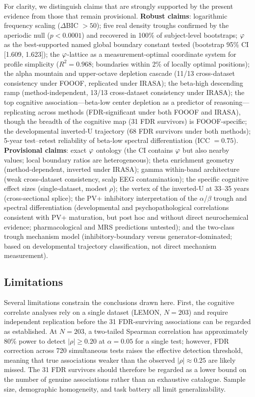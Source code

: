 For clarity, we distinguish claims that are strongly supported by the present evidence from those that remain provisional. \textbf{Robust claims}: logarithmic frequency scaling ($\Delta$BIC $> 50$); five real density troughs confirmed by the aperiodic null ($p < 0.0001$) and recovered in 100\% of subject-level bootstraps; $\varphi$ as the best-supported named global boundary constant tested (bootstrap 95\% CI [1.609, 1.623]); the $\varphi$-lattice as a measurement-optimal coordinate system for profile simplicity ($R^2 = 0.968$; boundaries within 2\% of locally optimal positions); the alpha mountain and upper-octave depletion cascade (11/13 cross-dataset consistency under FOOOF, replicated under IRASA); the beta-high descending ramp (method-independent, 13/13 cross-dataset consistency under IRASA); the top cognitive association---beta-low center depletion as a predictor of reasoning---replicating across methods (FDR-significant under both FOOOF and IRASA), though the breadth of the cognitive map (31 FDR survivors) is FOOOF-specific; the developmental inverted-U trajectory (68 FDR survivors under both methods); 5-year test--retest reliability of beta-low spectral differentiation (ICC $= 0.75$). \textbf{Provisional claims}: exact $\varphi$ ontology (the CI contains $\varphi$ but also nearby values; local boundary ratios are heterogeneous); theta enrichment geometry (method-dependent, inverted under IRASA); gamma within-band architecture (weak cross-dataset consistency, scalp EEG contamination); the specific cognitive effect sizes (single-dataset, modest $\rho$); the vertex of the inverted-U at 33--35 years (cross-sectional splice); the PV+ inhibitory interpretation of the $\alpha$/$\beta$ trough and spectral differentiation (developmental and psychopathological correlations consistent with PV+ maturation, but post hoc and without direct neurochemical evidence; pharmacological and MRS predictions untested); and the two-class trough mechanism model (inhibitory-boundary versus generator-dominated; based on developmental trajectory classification, not direct mechanism measurement).

\subsection{Limitations}
\label{sec:limitations}

Several limitations constrain the conclusions drawn here. First, the cognitive correlate analyses rely on a single dataset (LEMON, $N = 203$) and require independent replication before the 31 FDR-surviving associations can be regarded as established. At $N = 203$, a two-tailed Spearman correlation has approximately 80\% power to detect $|\rho| \geq 0.20$ at $\alpha = 0.05$ for a single test; however, FDR correction across 720 simultaneous tests raises the effective detection threshold, meaning that true associations weaker than the observed $|\rho| \approx 0.25$ are likely missed. The 31 FDR survivors should therefore be regarded as a lower bound on the number of genuine associations rather than an exhaustive catalogue. Sample size, demographic homogeneity, and task battery all limit generalizability.

